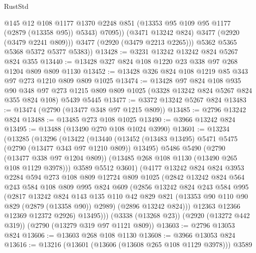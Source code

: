 \begin{lexlean}{RustStd}
\begin{coremodule}
                @145
                @12
                @108
                @1177
                @1370
                @2248
                @851
                (@13353 @95 @109 @95 @1177 (@2879 (@13358 @95)) @5343)
                @7095))
            (@3471 @13242 @824)
            @3477
            (@2920 (@3479 @2241 @809)))
          @3477
          (@2920 (@3479 @2213 @2265)))
        @5362
        @5365
        @5368
        @5372
        @5377
        @5383))
@13428 := @3231 @13242 @13242 @824 @5267 @824 @355
@13440 := @13428 @327 @824 @108 @1220 @23 @338 @97 @268 @1204 @809 @809 @1130
@13452 := @13428 @326 @824 @108 @1219 @85 @343 @97 @273 @1210 @809 @809 @1025
@13474 := @13428
    @97
    @824
    @108
    @935
    @90
    @348
    @97
    @273
    @1215
    @809
    @809
    @1025
    (@3328 @13242 @824 @5267 @824 @355 @824 @108)
    @5439
    @5445
@13477 := @3372 @13242 @5267 @824
@13483 := @13474 (@2790 (@13477 @348 @97 @1215 @809))
@13485 := @2796 @13242 @824
@13488 := @13485 @273 @108 @1025
@13490 := @3966 @13242 @824
@13495 := @13488 (@13490 @270 @108 @1024 @3990)
@13601 := @13234
    (@13285
      (@13296
        (@13422
          (@13440
            (@13452 (@13483 @13495) @5471 @5475 (@2790 (@13477 @343 @97 @1210 @809)) @13495)
            @5486
            @5490
            (@2790 (@13477 @338 @97 @1204 @809))
            (@13485 @268 @108 @1130 (@13490 @265 @108 @1129 @3978)))
          @3589
          @5512
          @3601)
        (@4177
          @13242
          @824
          @824
          @3953
          @2284
          @594
          @273
          @108
          @809
          @12724
          @809
          @1025
          (@2842
            @13242
            @824
            @564
            @243
            @584
            @108
            @809
            @995
            @824
            @609
            (@2856
              @13242
              @824
              @243
              @584
              @995
              (@2817
                @13242
                @824
                @143
                @135
                @110
                @42
                @829
                @821
                (@13353 @90 @110 @90 @829 (@2879 (@13358 @90)) @2989)
                (@2896 @13242 @824)))
            @12363
            @12366
            @12369
            @12372
            @2926)
          @13495)))
    (@3338 (@13268 @23))
    (@2920 (@13272 @442 @319))
    (@2790 (@13279 @319 @97 @1121 @809))
@13603 := @2796 @13053 @824
@13606 := @13603 @268 @108 @1130
@13608 := @3966 @13053 @824
@13616 := @13216 (@13601 (@13606 (@13608 @265 @108 @1129 @3978))) @3589

\end{coremodule}
\end{lexlean}
